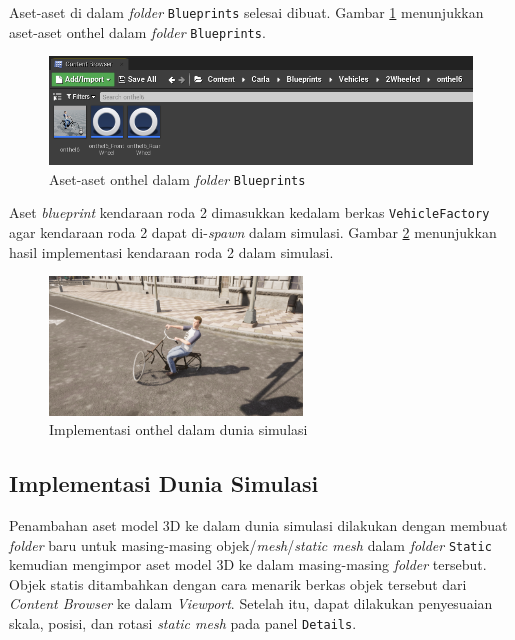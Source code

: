Aset-aset di dalam \textit{folder} \verb|Blueprints| selesai dibuat. Gambar
\ref{fig:onthel-assets-in-blueprints-folder} menunjukkan aset-aset onthel dalam
\textit{folder} \verb|Blueprints|.

\begin{figure}[!h]
    \centering
    \includegraphics[width=1\textwidth]{resources/chapter-4/onthel-assets-in-blueprints-folder.png}
    \caption{Aset-aset onthel dalam \textit{folder} \texttt{Blueprints}}
    \label{fig:onthel-assets-in-blueprints-folder}
\end{figure}

Aset \textit{blueprint} kendaraan roda 2 dimasukkan kedalam berkas
\verb|VehicleFactory| agar kendaraan roda 2 dapat di-\textit{spawn} dalam
simulasi. Gambar \ref{fig:onthel-carla} menunjukkan hasil implementasi kendaraan
roda 2 dalam simulasi.

\begin{figure}[!h]
    \centering
    \includegraphics[width=0.6\textwidth]{resources/chapter-4/onthel-carla.png}
    \caption{Implementasi onthel dalam dunia simulasi}
    \label{fig:onthel-carla}
\end{figure}

\subsection{Implementasi Dunia Simulasi}

Penambahan aset model 3D ke dalam dunia simulasi dilakukan dengan membuat
\textit{folder} baru untuk masing-masing objek/\textit{mesh}/\textit{static
mesh} dalam \textit{folder} \verb|Static| kemudian mengimpor aset model 3D ke
dalam masing-masing \textit{folder} tersebut. Objek statis ditambahkan dengan
cara menarik berkas objek tersebut dari \textit{Content Browser} ke dalam
\textit{Viewport}. Setelah itu, dapat dilakukan penyesuaian skala, posisi, dan
rotasi \textit{static mesh} pada panel \verb|Details|.

